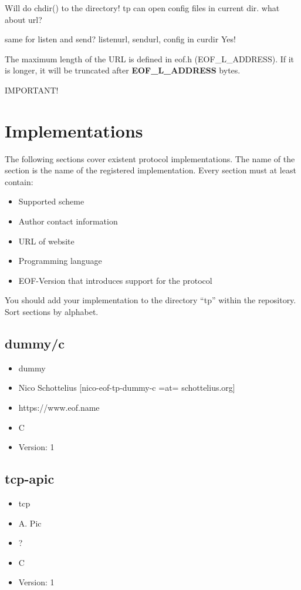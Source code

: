 \documentclass[12pt,a4paper]{book}
\begin{document}
{Will do chdir() to the directory! tp can open config files in current dir.
what about url?

same for listen and send?
   listenurl, sendurl, config in curdir
Yes!

The maximum length of the URL is defined in eof.h (EOF\_L\_ADDRESS).
If it is longer, it will be truncated after \textbf{EOF\_L\_ADDRESS} bytes.

IMPORTANT!
\section{Implementations}
The following sections cover existent protocol implementations.
The name of the section is the name of the registered implementation.
Every section must at least contain:
\begin{itemize}
\item Supported scheme
\item Author contact information
\item URL of website
\item Programming language
\item EOF-Version that introduces support for the protocol
\end{itemize}
You should add your implementation to the directory "`tp"' within the
repository.
Sort sections by alphabet.

\subsection{dummy/c}
\begin{itemize}
\item dummy
\item Nico Schottelius [nico-eof-tp-dummy-c =at= schottelius.org]
\item https://www.eof.name
\item C
\item Version: 1
\end{itemize}
\subsection{tcp-apic}
\begin{itemize}
\item tcp
\item A. Pic
\item ?
\item C
\item Version: 1
\end{itemize}
\appendix
}
\end{document}
